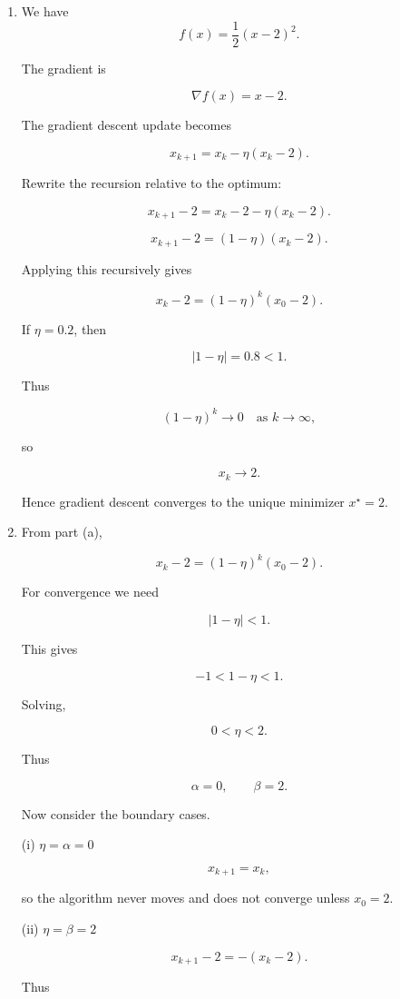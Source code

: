 \documentclass[
  12pt,
]{fphw}
\begin{document}
\begin{enumerate}

\item[(a)]

We have
\[
f(x) = \frac{1}{2}(x-2)^2.
\]

The gradient is

\[
\nabla f(x) = x-2.
\]

The gradient descent update becomes

\[
x_{k+1} = x_k - \eta(x_k-2).
\]

Rewrite the recursion relative to the optimum:

\[
x_{k+1}-2 = x_k-2 - \eta(x_k-2).
\]

\[
x_{k+1}-2 = (1-\eta)(x_k-2).
\]

Applying this recursively gives

\[
x_k - 2 = (1-\eta)^k (x_0-2).
\]

If $\eta = 0.2$, then

\[
|1-\eta| = 0.8 < 1.
\]

Thus

\[
(1-\eta)^k \to 0 \quad \text{as } k \to \infty,
\]

so

\[
x_k \to 2.
\]

Hence gradient descent converges to the unique minimizer $x^\star = 2$.

\item[(b)]

From part (a),

\[
x_k - 2 = (1-\eta)^k (x_0-2).
\]

For convergence we need

\[
|1-\eta| < 1.
\]

This gives

\[
-1 < 1-\eta < 1.
\]

Solving,

\[
0 < \eta < 2.
\]

Thus

\[
\alpha = 0, \qquad \beta = 2.
\]

Now consider the boundary cases.

(i) $\eta = \alpha = 0$

\[
x_{k+1} = x_k,
\]

so the algorithm never moves and does not converge unless $x_0=2$.

(ii) $\eta = \beta = 2$

\[
x_{k+1}-2 = - (x_k-2).
\]

Thus


\end{enumerate}
\end{document}
